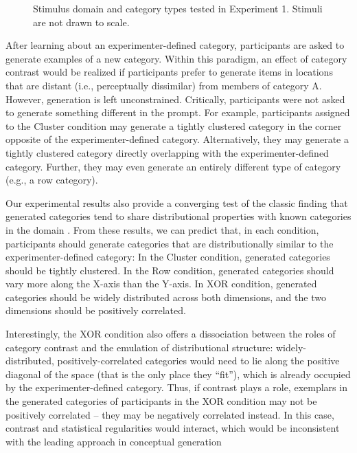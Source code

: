 \documentclass[12pt]{article}
\newcommand\inputpgf[2]{{
\let\pgfimageWithoutPath\pgfimage
\renewcommand{\pgfimage}[2][]{\pgfimageWithoutPath[##1]{#1/##2}}

}}
\begin{document}
\begin{flushleft}
\begin{figure}
    \begin{center}
    \inputpgf{figs/}{e1-conditions.pgf}
    \caption{Stimulus domain and category types tested in Experiment 1. Stimuli are not drawn to scale.}
    \label{fig:e1-conditions}
    \end{center}
\end{figure}

After learning about an experimenter-defined category, participants are asked to generate examples of a new category. Within this paradigm, an effect of category contrast would be realized if participants prefer to generate items in locations that are distant (i.e., perceptually dissimilar) from members of category A. However, generation is left unconstrained. Critically, participants were not asked to generate something different in the prompt. For example, participants assigned to the Cluster condition may generate a tightly clustered category in the corner opposite of the experimenter-defined category. Alternatively, they may generate a tightly clustered category directly overlapping with the experimenter-defined category. Further, they may even generate an entirely different type of category (e.g., a row category). 

Our experimental results also provide a converging test of the classic finding that generated categories tend to share distributional properties with known categories in the domain \citep{jern2013probabilistic,ward1994structured}. From these results, we can predict that, in each condition, participants should generate categories that are distributionally similar to the experimenter-defined category: In the Cluster condition, generated categories should be tightly clustered. In the Row condition, generated categories should vary more along the X-axis than the Y-axis. In XOR condition, generated categories should be widely distributed across both dimensions, and the two dimensions should be positively correlated. 

Interestingly, the XOR condition also offers a dissociation between the roles of category contrast and the emulation of distributional structure: widely-distributed, positively-correlated categories would need to lie along the positive diagonal of the space (that is the only place they ``fit''), which is already occupied by the experimenter-defined category. Thus, if contrast plays a role, exemplars in the generated categories of participants in the XOR condition may not be positively correlated -- they may be negatively correlated instead. In this case, contrast and statistical regularities would interact, which would be inconsistent with the leading approach in conceptual generation \citep{jern2013probabilistic}



\end{flushleft}
\end{document}

